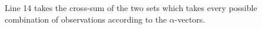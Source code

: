 \documentclass{article} %
\newcommand{\close}{\mathit{close}}
\begin{document}
Line 14 takes the cross-sum of the two sets which takes every possible combination of observations according to the $\alpha$-vectors. 
\end{document}
